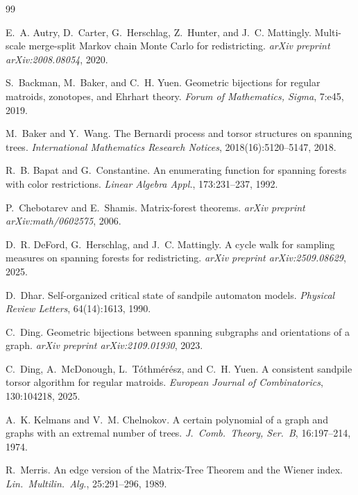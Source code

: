 \documentclass[11pt]{article}
\begin{document}
\begin{thebibliography}{99}

E.~A. Autry, D.~Carter, G.~Herschlag, Z.~Hunter, and J.~C. Mattingly.
\newblock Multi-scale merge-split {M}arkov chain {M}onte {C}arlo for
  redistricting.
\newblock \emph{arXiv preprint arXiv:2008.08054}, 2020.

S.~Backman, M.~Baker, and C.~H. Yuen.
\newblock Geometric bijections for regular matroids, zonotopes, and {E}hrhart
  theory.
\newblock \emph{Forum of Mathematics, Sigma}, 7:e45, 2019.

M.~Baker and Y.~Wang.
\newblock The {B}ernardi process and torsor structures on spanning trees.
\newblock \emph{International Mathematics Research Notices}, 2018(16):5120--5147,
  2018.

R.~B. Bapat and G.~Constantine.
\newblock An enumerating function for spanning forests with color restrictions.
\newblock \emph{Linear Algebra Appl.}, 173:231--237, 1992.

P.~Chebotarev and E.~Shamis.
\newblock Matrix-forest theorems.
\newblock \emph{arXiv preprint arXiv:math/0602575}, 2006.

D.~R. DeFord, G.~Herschlag, and J.~C. Mattingly.
\newblock A cycle walk for sampling measures on spanning forests for
  redistricting.
\newblock \emph{arXiv preprint arXiv:2509.08629}, 2025.

D.~Dhar.
\newblock Self-organized critical state of sandpile automaton models.
\newblock \emph{Physical Review Letters}, 64(14):1613, 1990.

C.~Ding.
\newblock Geometric bijections between spanning subgraphs and orientations of a
  graph.
\newblock \emph{arXiv preprint arXiv:2109.01930}, 2023.

C.~Ding, A.~McDonough, L.~T\'othm\'er\'esz, and C.~H. Yuen.
\newblock A consistent sandpile torsor algorithm for regular matroids.
\newblock \emph{European Journal of Combinatorics}, 130:104218, 2025.

A.~K. Kelmans and V.~M. Chelnokov.
\newblock A certain polynomial of a graph and graphs with an extremal number of
  trees.
\newblock \emph{J.\ Comb.\ Theory, Ser.\ B}, 16:197--214, 1974.

R.~Merris.
\newblock An edge version of the {M}atrix-{T}ree {T}heorem and the {W}iener
  index.
\newblock \emph{Lin.\ Multilin.\ Alg.}, 25:291--296, 1989.


\end{thebibliography}
\end{document}
